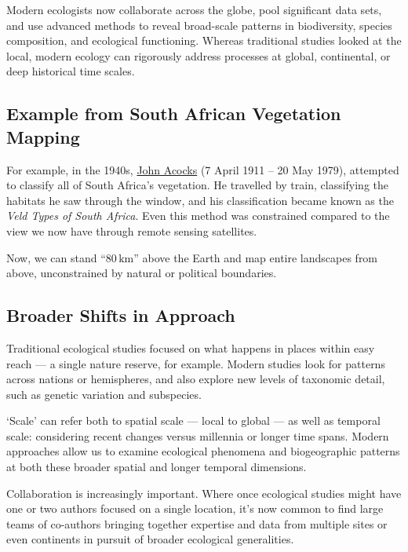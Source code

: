 \documentclass[
  10pt,
]{book}
\begin{document}
Modern ecologists now collaborate across the globe, pool significant
data sets, and use advanced methods to reveal broad-scale patterns in
biodiversity, species composition, and ecological functioning. Whereas
traditional studies looked at the local, modern ecology can rigorously
address processes at global, continental, or deep historical time
scales.

\subsection{Example from South African Vegetation
Mapping}\label{example-from-south-african-vegetation-mapping}

For example, in the 1940s,
\href{https://en.wikipedia.org/wiki/John_Phillip_Harison_Acocks}{John
Acocks} (7 April 1911 -- 20 May 1979), attempted to classify all of
South Africa's vegetation. He travelled by train, classifying the
habitats he saw through the window, and his classification became known
as the \emph{Veld Types of South Africa}. Even this method was
constrained compared to the view we now have through remote sensing
satellites.

Now, we can stand ``\(80\,\mathrm{km}\)'' above the Earth and map entire
landscapes from above, unconstrained by natural or political boundaries.

\subsection{Broader Shifts in
Approach}\label{broader-shifts-in-approach}

Traditional ecological studies focused on what happens in places within
easy reach --- a single nature reserve, for example. Modern studies look
for patterns across nations or hemispheres, and also explore new levels
of taxonomic detail, such as genetic variation and subspecies.

`Scale' can refer both to spatial scale --- local to global --- as well
as temporal scale: considering recent changes versus millennia or longer
time spans. Modern approaches allow us to examine ecological phenomena
and biogeographic patterns at both these broader spatial and longer
temporal dimensions.

Collaboration is increasingly important. Where once ecological studies
might have one or two authors focused on a single location, it's now
common to find large teams of co-authors bringing together expertise and
data from multiple sites or even continents in pursuit of broader
ecological generalities.
\end{document}
